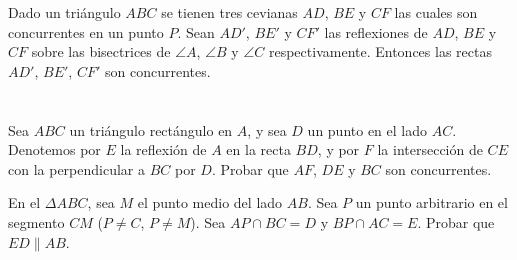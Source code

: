\documentclass[12pt]{article}
\begin{document}
   \begin{section-definition}
      Dado un triángulo $ABC$ se tienen tres cevianas $AD$, $BE$ y $CF$ las cuales son concurrentes en un punto $P$.
      Sean $AD'$, $BE'$ y $CF'$ las reflexiones de $AD$, $BE$ y $CF$ sobre las bisectrices de $\angle A$, $\angle B$ y $\angle C$ respectivamente.
      Entonces las rectas $AD'$, $BE'$, $CF'$ son concurrentes.
   \end{section-definition}
   
   \section{}
   \section{}

   \begin{section-problem}
      Sea $ABC$ un triángulo rectángulo en $A$, y sea $D$ un punto en el lado $AC$.
      Denotemos por $E$ la reflexión de $A$ en la recta $BD$, y por $F$ la intersección de $CE$ con la perpendicular a $BC$ por $D$.
      Probar que $AF$, $DE$ y $BC$ son concurrentes.
   \end{section-problem}

   \begin{section-problem}
      En el $\Delta ABC$, sea $M$ el punto medio del lado $AB$.
      Sea $P$ un punto arbitrario en el segmento $CM$ ($P \neq C$, $P \neq M$).
      Sea $AP \cap BC = D$ y $BP \cap AC = E$.
      Probar que $ED \parallel AB$.
   \end{section-problem}
\end{document}

